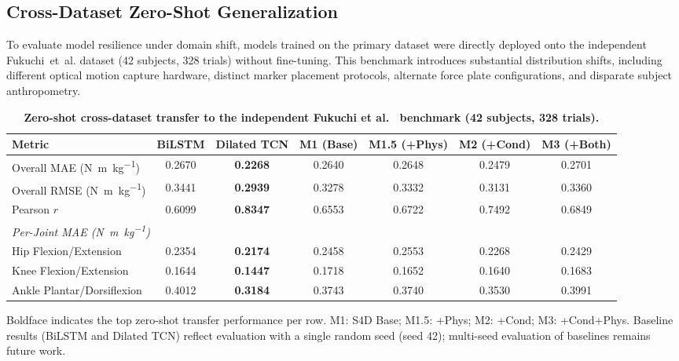 \documentclass[fleqn,10pt]{wlscirep}
\newcommand{\Nmskg}{\si{\newton\metre\per\kilogram}}
\begin{document}
\subsection{Cross-Dataset Zero-Shot Generalization}

To evaluate model resilience under domain shift, models trained on the primary dataset were directly deployed onto the independent Fukuchi~et~al.\cite{fukuchi2018public} dataset (42 subjects, 328 trials) without fine-tuning. This benchmark introduces substantial distribution shifts, including different optical motion capture hardware, distinct marker placement protocols, alternate force plate configurations, and disparate subject anthropometry.

\begin{table}[ht]
\centering
\caption{\textbf{Zero-shot cross-dataset transfer to the independent Fukuchi et al.~\cite{fukuchi2018public} benchmark (42 subjects, 328 trials).}}
\label{tab:crossdataset}
\small
\setlength{\tabcolsep}{5pt}
\begin{tabular}{@{}l cccccc@{}}
\toprule
\textbf{Metric} & \textbf{BiLSTM} & \textbf{Dilated TCN} & \textbf{M1 (Base)} & \textbf{M1.5 (+Phys)} & \textbf{M2 (+Cond)} & \textbf{M3 (+Both)} \\
\midrule
Overall MAE (\Nmskg) & 0.2670 & \textbf{0.2268} & 0.2640 & 0.2648 & 0.2479 & 0.2701 \\
Overall RMSE (\Nmskg) & 0.3441 & \textbf{0.2939} & 0.3278 & 0.3332 & 0.3131 & 0.3360 \\
Pearson $r$ & 0.6099 & \textbf{0.8347} & 0.6553 & 0.6722 & 0.7492 & 0.6849 \\
\midrule
\multicolumn{7}{l}{\emph{Per-Joint MAE (\Nmskg)}} \\
Hip Flexion/Extension & 0.2354 & \textbf{0.2174} & 0.2458 & 0.2553 & 0.2268 & 0.2429 \\
Knee Flexion/Extension & 0.1644 & \textbf{0.1447} & 0.1718 & 0.1652 & 0.1640 & 0.1683 \\
Ankle Plantar/Dorsiflexion & 0.4012 & \textbf{0.3184} & 0.3743 & 0.3740 & 0.3530 & 0.3991 \\
\bottomrule
\end{tabular}
\par\vspace{1.5mm}
{\raggedright\footnotesize Boldface indicates the top zero-shot transfer performance per row. M1: S4D Base; M1.5: +Phys; M2: +Cond; M3: +Cond+Phys. Baseline results (BiLSTM and Dilated TCN) reflect evaluation with a single random seed (seed 42); multi-seed evaluation of baselines remains future work.\par}
\end{table}
\end{document}
